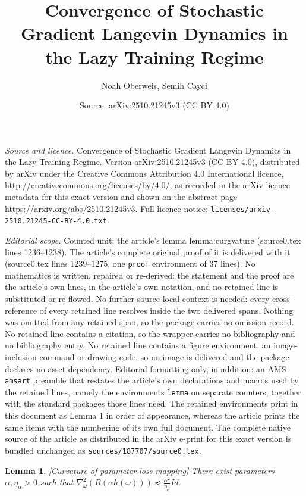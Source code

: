 \documentclass[10pt,a4paper]{amsart}
\title{Convergence of Stochastic Gradient Langevin Dynamics in the Lazy Training Regime}
\author{Noah Oberweis, Semih Cayci}
\date{Source: arXiv:2510.21245v3 (CC BY 4.0)}
\newtheorem{lemma}{Lemma}
\begin{document}
\maketitle

\noindent\emph{Source and licence.} Convergence of Stochastic Gradient Langevin Dynamics in the Lazy Training Regime. Version arXiv:2510.21245v3 (CC BY 4.0), distributed by arXiv under the Creative Commons Attribution 4.0 International licence, http://creativecommons.org/licenses/by/4.0/, as recorded in the arXiv licence metadata for this exact version and shown on the abstract page https://arxiv.org/abs/2510.21245v3. Full licence notice: \texttt{licenses/arxiv-2510.21245-CC-BY-4.0.txt}.\par\smallskip

\noindent\textit{Editorial scope.} Counted unit: the article's lemma lemma:curgvature (source0.tex lines 1236--1238). The article's complete original proof of it is delivered with it (source0.tex lines 1239--1275, one \texttt{proof} environment of 37 lines). No mathematics is written, repaired or re-derived: the statement and the proof are the article's own lines, in the article's own notation, and no retained line is substituted or re-flowed.  No further source-local context is needed: every cross-reference of every retained line resolves inside the two delivered spans.  Nothing was omitted from any retained span, so the package carries no omission record.  No retained line contains a citation, so the wrapper carries no bibliography and no bibliography entry.  No retained line contains a figure environment, an image-inclusion command or drawing code, so no image is delivered and the package declares no asset dependency.  Editorial formatting only, in addition: an AMS \texttt{amsart} preamble that restates the article's own declarations and macros used by the retained lines, namely the environments \texttt{lemma} on separate counters, together with the standard packages those lines need.  The retained environments print in this document as Lemma 1 in order of appearance, whereas the article prints the same items with the numbering of its own full document.  The complete native source of the article as distributed in the arXiv e-print for this exact version is bundled unchanged as \texttt{sources/187707/source0.tex}.
\begin{lemma}\label{lemma:curgvature}[Curvature of parameter-loss-mapping]
    There exist parameters $\alpha,\eta_\alpha>0$ such that $\nabla^2_\omega(R(\alpha h(\omega)))\preceq \frac{\alpha^2}{\eta_\alpha} Id$.
\end{lemma}
\end{document}
